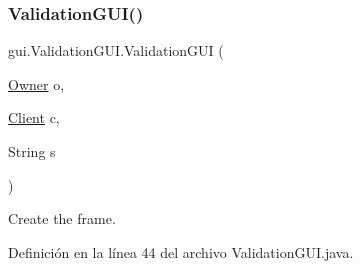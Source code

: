 \subsubsection{\texorpdfstring{ValidationGUI()}{ValidationGUI()}}
{\footnotesize\ttfamily gui.\+Validation\+G\+U\+I.\+Validation\+G\+UI (\begin{DoxyParamCaption}\item[{\mbox{\hyperlink{classdomain_1_1_owner}{Owner}}}]{o,  }\item[{\mbox{\hyperlink{classdomain_1_1_client}{Client}}}]{c,  }\item[{String}]{s }\end{DoxyParamCaption})}



Create the frame. 



Definición en la línea 44 del archivo Validation\+G\+U\+I.\+java.



